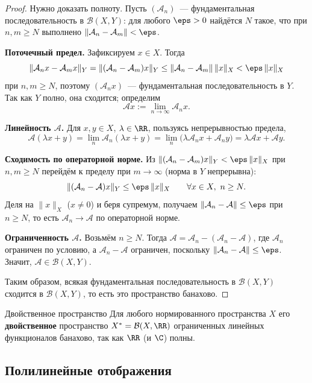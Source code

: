 \begin{proof}
	Нужно доказать полноту. Пусть $(\mathcal{A}_n)$~--- фундаментальная последовательность в $\mathcal{B}(X, Y)$: для любого $\eps > 0$ найдётся $N$ такое, что при $n, m \ge N$ выполнено $\|\mathcal{A}_n - \mathcal{A}_m\| < \eps$.

	\textbf{Поточечный предел.} Зафиксируем $x \in X$. Тогда
	\[
	\|\mathcal{A}_n x - \mathcal{A}_m x\|_Y = \|(\mathcal{A}_n - \mathcal{A}_m)x\|_Y \le \|\mathcal{A}_n - \mathcal{A}_m\|\,\|x\|_X < \eps\,\|x\|_X
	\]
	при $n, m \ge N$, поэтому $(\mathcal{A}_n x)$~--- фундаментальная последовательность в $Y$. Так как $Y$ полно, она сходится; определим
	\[
	\mathcal{A}x := \lim_{n \to \infty} \mathcal{A}_n x.
	\]

	\textbf{Линейность $\mathcal{A}$.} Для $x, y \in X$, $\lambda \in \RR$, пользуясь непрерывностью предела,
	\[
	\mathcal{A}(\lambda x + y) = \lim_{n} \mathcal{A}_n(\lambda x + y) = \lim_{n}\bigl(\lambda \mathcal{A}_n x + \mathcal{A}_n y\bigr) = \lambda \mathcal{A}x + \mathcal{A}y.
	\]

	\textbf{Сходимость по операторной норме.} Из $\|(\mathcal{A}_n - \mathcal{A}_m)x\|_Y < \eps\,\|x\|_X$ при $n, m \ge N$ перейдём к пределу при $m \to \infty$ (норма в $Y$ непрерывна):
	\[
	\|(\mathcal{A}_n - \mathcal{A})x\|_Y \le \eps\,\|x\|_X \qquad \forall x \in X,\ n \ge N.
	\]
	Деля на $\|x\|_X$ ($x \neq 0$) и беря супремум, получаем $\|\mathcal{A}_n - \mathcal{A}\| \le \eps$ при $n \ge N$, то есть $\mathcal{A}_n \to \mathcal{A}$ по операторной норме.

	\textbf{Ограниченность $\mathcal{A}$.} Возьмём $n \ge N$. Тогда $\mathcal{A} = \mathcal{A}_n - (\mathcal{A}_n - \mathcal{A})$, где $\mathcal{A}_n$ ограничен по условию, а $\mathcal{A}_n - \mathcal{A}$ ограничен, поскольку $\|\mathcal{A}_n - \mathcal{A}\| \le \eps$. Значит, $\mathcal{A} \in \mathcal{B}(X, Y)$.

	Таким образом, всякая фундаментальная последовательность в $\mathcal{B}(X, Y)$ сходится в $\mathcal{B}(X, Y)$, то есть это пространство банахово.
\end{proof}

\begin{Corollary}{Двойственное пространство}{}
	Для любого нормированного пространства $X$ его \textbf{двойственное} пространство $X^* = \mathcal{B}(X, \RR)$ ограниченных линейных функционалов банахово, так как $\RR$ (и $\C$) полны.
\end{Corollary}

\subsection*{Полилинейные отображения}

